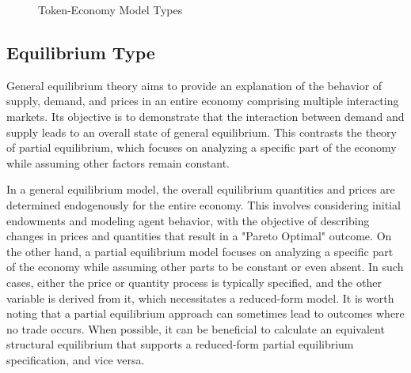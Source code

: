 \documentclass[11pt]{article}
\begin{document}
\begin{figure}[h]
\caption{Token-Economy Model Types} \label{fig:temt}
\end{figure}

\subsection{Equilibrium Type}
General equilibrium theory aims to provide an explanation of the behavior of supply, demand, and prices in an entire economy comprising multiple interacting markets. Its objective is to demonstrate that the interaction between demand and supply leads to an overall state of general equilibrium. This contrasts the theory of partial equilibrium, which focuses on analyzing a specific part of the economy while assuming other factors remain constant.

In a general equilibrium model, the overall equilibrium quantities and prices are determined endogenously for the entire economy. This involves considering initial endowments and modeling agent behavior, with the objective of describing changes in prices and quantities that result in a "Pareto Optimal" outcome. On the other hand, a partial equilibrium model focuses on analyzing a specific part of the economy while assuming other parts to be constant or even absent. In such cases, either the price or quantity process is typically specified, and the other variable is derived from it, which necessitates a reduced-form model. It is worth noting that a partial equilibrium approach can sometimes lead to outcomes where no trade occurs. When possible, it can be beneficial to calculate an equivalent structural equilibrium that supports a reduced-form partial equilibrium specification, and vice versa. 
\end{document}
